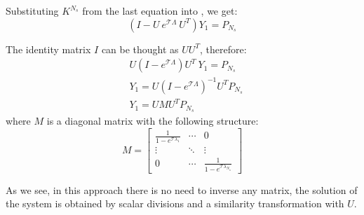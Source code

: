 Substituting $K^{N_s}$ from the last equation into , we get:
\[
  (I - U \: e^{\mathcal{T} \Lambda} \: U^T) Y_1 = P_{N_s}
\]

The identity matrix $I$ can be thought as $U U^T$, therefore:
\begin{align*}
  & U (I - e^{\mathcal{T} \Lambda}) U^T \: Y_1 = P_{N_s} \\
  & Y_1 = U (I - e^{\mathcal{T} \Lambda})^{-1} U^T P_{N_s} \\
  & Y_1 = U M U^T P_{N_s}
\end{align*}
where $M$ is a diagonal matrix with the following structure:
\[
  M = \left[
    \begin{array}{ccc}
      \frac{1}{1 - e^{\mathcal{T} \lambda_1}} & \cdots & 0 \\
      \vdots & \ddots & \vdots \\
      0 & \cdots & \frac{1}{1 - e^{\mathcal{T} \lambda_{N_n}}}
    \end{array}
  \right]
\]

As we see, in this approach there is no need to inverse any matrix, the solution of the system is obtained by scalar divisions and a similarity transformation with $U$.
